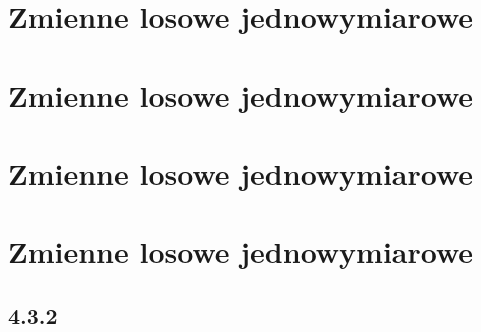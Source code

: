 \documentclass{article}
\begin{document}
\section{Zmienne losowe jednowymiarowe}
\section{Zmienne losowe jednowymiarowe}
\section{Zmienne losowe jednowymiarowe}
\section{Zmienne losowe jednowymiarowe}
\subsection*{4.3.2}
\end{document}
